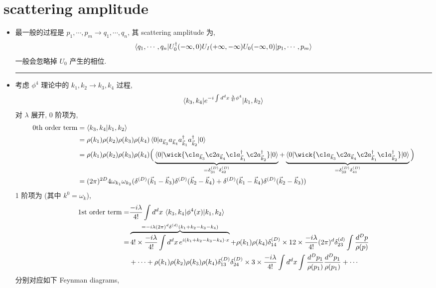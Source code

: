 \section{scattering amplitude}
\begin{itemize}
	\item 最一般的过程是 $p_1, \cdots, p_m \rightarrow q_1, \cdots, q_n$, 其 scattering amplitude 为,
	\begin{equation}
		\braket{q_1, \cdots, q_n | U_0^\dag(- \infty, 0) U_I(+ \infty, - \infty) U_0(- \infty, 0) | p_1, \cdots, p_m}
	\end{equation}
	一般会忽略掉 $U_0$ 产生的相位.
	
	\noindent\rule[0.5ex]{\linewidth}{0.5pt} %
	
	\item 考虑 $\phi^4$ 理论中的 $k_1, k_2 \rightarrow k_3, k_4$ 过程,
	\begin{equation}
		\braket{k_3, k_4 | e^{- i \int d^d x \, \frac{\lambda}{4!} \phi^4} | k_1, k_2}
	\end{equation}
	对 $\lambda$ 展开, 0 阶项为,
	\begin{align}
		\text{0th order term} &= \braket{k_3, k_4 | k_1, k_2} \notag \\
		&= \rho(k_1) \rho(k_2) \rho(k_3) \rho(k_4) \braket{0 | a_{\vec{k}_3} a_{\vec{k}_4} a^\dag_{\vec{k}_1} a^\dag_{\vec{k}_2} | 0} \notag \\
		&= \rho(k_1) \rho(k_2) \rho(k_3) \rho(k_4) \Big( \underbrace{\braket{0 | \wick{
			\c1 a_{\vec{k}_3} \c2 a_{\vec{k}_4} \c1 a^\dag_{\vec{k}_1} \c2 a^\dag_{\vec{k}_2}
		} | 0}}_{= \delta^{(D)}_{3 1} \delta^{(D)}_{4 2}} + \underbrace{\braket{0 | \wick{
			\c1 a_{\vec{k}_3} \c2 a_{\vec{k}_4} \c2 a^\dag_{\vec{k}_1} \c1 a^\dag_{\vec{k}_2}
		} | 0}}_{= \delta^{(D)}_{3 2} \delta^{(D)}_{4 1}} \Big) \notag \\
		&= (2 \pi)^{2 D} 4 \omega_{k_1} \omega_{k_2} (\delta^{(D)}(\vec{k}_1 - \vec{k}_3) \delta^{(D)}(\vec{k}_2 - \vec{k}_4) + \delta^{(D)}(\vec{k}_1 - \vec{k}_4) \delta^{(D)}(\vec{k}_2 - \vec{k}_3))
	\end{align}
	1 阶项为 (其中 $k^0 = \omega_k$),
	\begin{align}
		\text{1st order term} =& \frac{- i \lambda}{4!} \int d^d x \, \braket{k_3, k_4 | \phi^4(x) | k_1, k_2} \notag \\
		=& \overbrace{4! \times \frac{- i \lambda}{4!} \int d^d x \, e^{i (k_1 + k_2 - k_3 - k_4) \cdot x}}^{= - i \lambda (2 \pi)^d \delta^{(d)}(k_1 + k_2 - k_3 - k_4)} + \rho(k_1) \rho(k_4) \delta^{(D)}_{1 4} \times 12 \times \frac{- i \lambda}{4!} (2 \pi)^d \delta^{(d)}_{2 3} \int \frac{d^D p}{\rho(p)} \notag \\
		& + \cdots + \rho(k_1) \rho(k_2) \rho(k_3) \rho(k_4) \delta^{(D)}_{1 3} \delta^{(D)}_{2 4} \times 3 \times \frac{- i \lambda}{4!} \int d^d x \int \frac{d^D p_1}{\rho(p_1)} \frac{d^D p_1}{\rho(p_1)} + \cdots
	\end{align}
	分别对应如下 Feynman diagrams,
	

\end{itemize}
